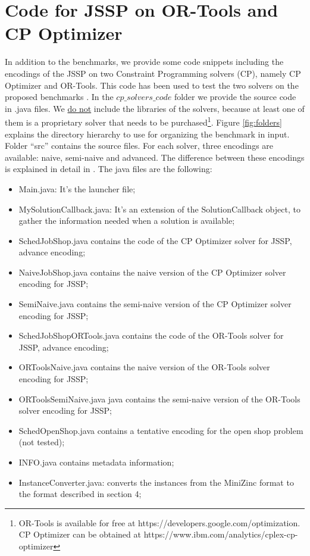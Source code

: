 \documentclass{article}
\begin{document}
\section{Code for JSSP on OR-Tools and CP Optimizer}
In addition to the benchmarks, we provide some code snippets including the encodings of the JSSP on two Constraint Programming solvers (CP), namely CP Optimizer and OR-Tools. This code has been used to test the two solvers on the proposed benchmarks \cite{dacol2019cp,dacol2019iclp}. In the $cp\_solvers\_code$ folder we provide the source code in .java files. We \underline{do not} include the libraries of the solvers, because at least one of them is a proprietary solver that needs to be purchased\footnote{OR-Tools is available for free at https://developers.google.com/optimization. CP Optimizer can be obtained at https://www.ibm.com/analytics/cplex-cp-optimizer}. Figure \ref{fig:folders} explains the directory hierarchy to use for organizing the benchmark in input. Folder ``src'' contains the source files. For each solver, three encodings are available: naive, semi-naive and advanced. The difference between these encodings is explained in detail in \cite{dacol2019cp}. The java files are the following:
\begin{itemize}
\item Main.java: It's the launcher file;
\item MySolutionCallback.java: It's an extension of the SolutionCallback object, to gather the information needed when a solution is available;
\item SchedJobShop.java contains the code of the CP Optimizer solver for JSSP, advance encoding;
\item NaiveJobShop.java contains the naive version of the CP Optimizer solver encoding for JSSP;
\item SemiNaive.java contains the semi-naive version of the CP Optimizer solver encoding for JSSP;
\item SchedJobShopORTools.java contains the code of the OR-Tools solver for JSSP, advance encoding;
\item ORToolsNaive.java contains the naive version of the OR-Tools solver encoding for JSSP;
\item ORToolsSemiNaive.java java contains the semi-naive version of the OR-Tools solver encoding for JSSP;
\item SchedOpenShop.java contains a tentative encoding for the open shop problem (not tested);
\item INFO.java contains metadata information;
\item InstanceConverter.java: converts the instances from the MiniZinc format to the format described in section 4;
\end{itemize}
\end{document}
